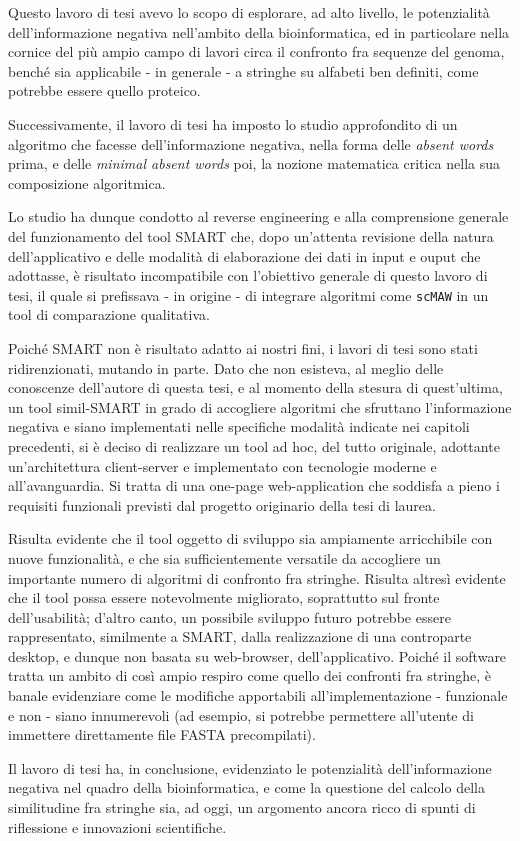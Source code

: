 Questo lavoro di tesi avevo lo scopo di esplorare, ad alto livello, le potenzialità dell'informazione negativa nell'ambito della bioinformatica, ed in particolare nella cornice del più ampio campo di lavori circa il confronto fra sequenze del genoma, benché sia applicabile - in generale - a stringhe su alfabeti ben definiti, come potrebbe essere quello proteico. 

Successivamente, il lavoro di tesi ha imposto lo studio approfondito di un algoritmo che facesse dell'informazione negativa, nella forma delle \textit{absent words} prima, e delle \textit{minimal absent words} poi, la nozione matematica critica nella sua composizione algoritmica. 

Lo studio ha dunque condotto al reverse engineering e alla comprensione generale del funzionamento del tool SMART che, dopo un'attenta revisione della natura dell'applicativo e delle modalità di elaborazione dei dati in input e ouput che adottasse, è risultato incompatibile con l'obiettivo generale di questo lavoro di tesi, il quale si prefissava - in origine - di integrare algoritmi come \verb|scMAW| in un tool di comparazione qualitativa.

\vspace{3mm}

Poiché SMART non è risultato adatto ai nostri fini, i lavori di tesi sono stati ridirenzionati, mutando in parte. Dato che non esisteva, al meglio delle conoscenze dell'autore di questa tesi,  e al momento della stesura di quest'ultima, un tool simil-SMART in grado di accogliere algoritmi che sfruttano l'informazione negativa e siano implementati nelle specifiche modalità indicate nei capitoli precedenti, si è deciso di realizzare un tool ad hoc, del tutto originale, adottante un'architettura client-server e implementato con tecnologie moderne e all'avanguardia. Si tratta di una one-page web-application che soddisfa a pieno i requisiti funzionali previsti dal progetto originario della tesi di laurea.

\vspace{3mm}

Risulta evidente che il tool oggetto di sviluppo sia ampiamente arricchibile con nuove funzionalità, e che sia sufficientemente versatile da accogliere un importante numero di algoritmi di confronto fra stringhe. Risulta altresì evidente che il tool possa essere notevolmente migliorato, soprattutto sul fronte dell'usabilità; d'altro canto, un possibile sviluppo futuro potrebbe essere rappresentato, similmente a SMART, dalla realizzazione di una controparte desktop, e dunque non basata su web-browser, dell'applicativo. Poiché il software tratta un ambito di così ampio respiro come quello dei confronti fra stringhe, è banale evidenziare come le modifiche apportabili all'implementazione - funzionale e non - siano innumerevoli (ad esempio, si potrebbe permettere all'utente di immettere direttamente file FASTA precompilati).

\vspace{3mm}

Il lavoro di tesi ha, in conclusione, evidenziato le potenzialità dell'informazione negativa nel quadro della bioinformatica, e come la questione del calcolo della similitudine fra stringhe sia, ad oggi, un argomento ancora ricco di spunti di riflessione e innovazioni scientifiche.